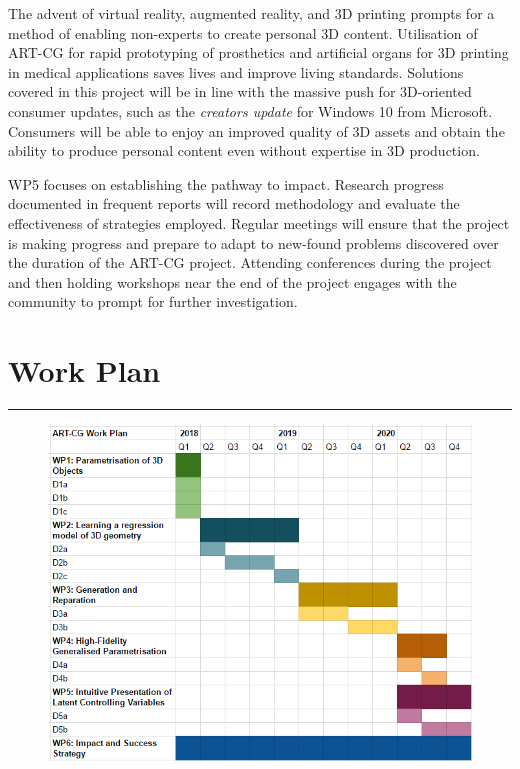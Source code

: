 \documentclass[a4paper, 11pt, onecolumn]{article} %
\numberwithin{equation}{section} %
\numberwithin{figure}{section} %
\numberwithin{table}{section} %
\begin{document}
The advent of virtual reality, augmented reality, and 3D printing prompts for a method of enabling non-experts to create personal 3D content. Utilisation of ART-CG for rapid prototyping of prosthetics and artificial organs for 3D printing in medical applications saves lives and improve living standards. Solutions covered in this project will be in line with the massive push for 3D-oriented consumer updates, such as the \textit{creators update} for Windows 10 from Microsoft. Consumers will be able to enjoy an improved quality of 3D assets and obtain the ability to produce personal content even without expertise in 3D production.

WP5 focuses on establishing the pathway to impact. Research progress documented in frequent reports will record methodology and evaluate the effectiveness of strategies employed. Regular meetings will ensure that the project is making progress and prepare to adapt to new-found problems discovered over the duration of the ART-CG project. Attending conferences during the project and then holding workshops near the end of the project engages with the community to prompt for further investigation.

\newpage

\section*{Work Plan}
\hrule\vspace{0.5em}

\begin{figure}[!h]
	\centering
	\includegraphics[scale=0.9]{images/workplan}\\
\end{figure}
\end{document}

